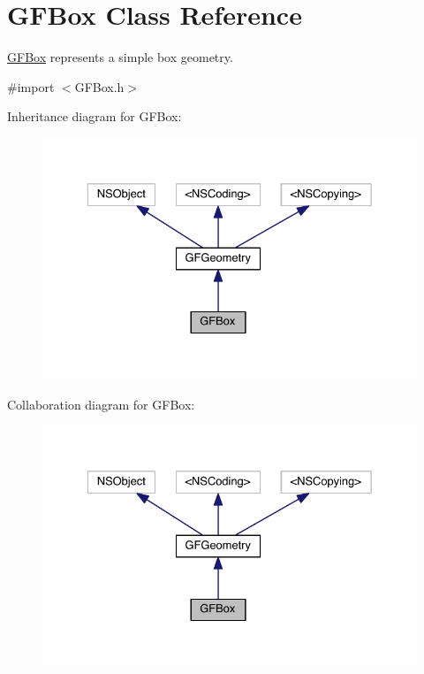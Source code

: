 \hypertarget{interface_g_f_box}{}\section{G\+F\+Box Class Reference}
\label{interface_g_f_box}


\hyperlink{interface_g_f_box}{G\+F\+Box} represents a simple box geometry.  




{\ttfamily \#import $<$G\+F\+Box.\+h$>$}



Inheritance diagram for G\+F\+Box\+:\nopagebreak
\begin{figure}[H]
\begin{center}
\leavevmode
\includegraphics[width=329pt]{interface_g_f_box__inherit__graph}
\end{center}
\end{figure}


Collaboration diagram for G\+F\+Box\+:\nopagebreak
\begin{figure}[H]
\begin{center}
\leavevmode
\includegraphics[width=329pt]{interface_g_f_box__coll__graph}
\end{center}
\end{figure}

